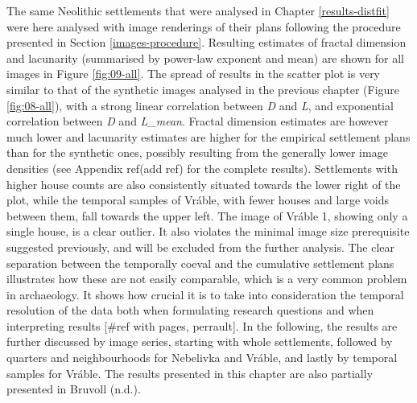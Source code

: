 \documentclass[
  12pt,
  a4paper, twoside]{book}
\begin{document}
The same Neolithic settlements that were analysed in Chapter \ref{results-distfit} were here analysed with image renderings of their plans following the procedure presented in Section \ref{images-procedure}. Resulting estimates of fractal dimension and lacunarity (summarised by power-law exponent and mean) are shown for all images in Figure \ref{fig:09-all}. The spread of results in the scatter plot is very similar to that of the synthetic images analysed in the previous chapter (Figure \ref{fig:08-all}), with a strong linear correlation between \emph{D} and \emph{L}, and exponential correlation between \emph{D} and \emph{L\_mean}. Fractal dimension estimates are however much lower and lacunarity estimates are higher for the empirical settlement plans than for the synthetic ones, possibly resulting from the generally lower image densities (see Appendix ref(add ref) for the complete results). Settlements with higher house counts are also consistently situated towards the lower right of the plot, while the temporal samples of Vráble, with fewer houses and large voids between them, fall towards the upper left. The image of Vráble 1, showing only a single house, is a clear outlier. It also violates the minimal image size prerequisite suggested previously, and will be excluded from the further analysis. The clear separation between the temporally coeval and the cumulative settlement plans illustrates how these are not easily comparable, which is a very common problem in archaeology. It shows how crucial it is to take into consideration the temporal resolution of the data both when formulating research questions and when interpreting results {[}\#ref with pages, perrault{]}. In the following, the results are further discussed by image series, starting with whole settlements, followed by quarters and neighbourhoods for Nebelivka and Vráble, and lastly by temporal samples for Vráble. The results presented in this chapter are also partially presented in Bruvoll (n.d.).
\end{document}
